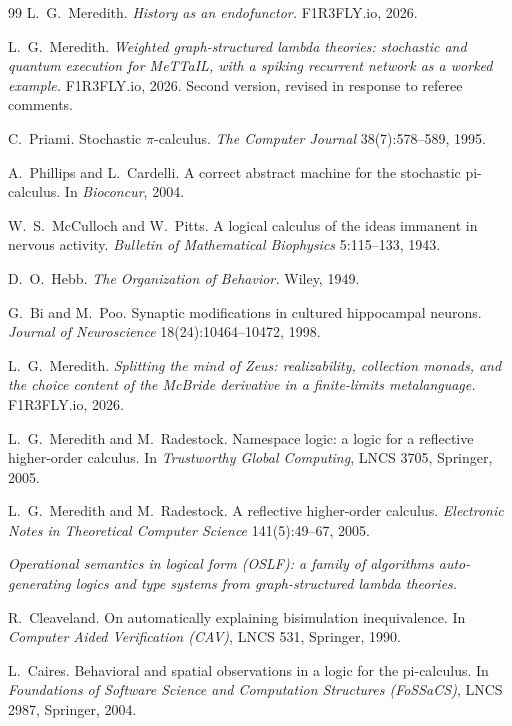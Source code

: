 \begin{thebibliography}{99}
L.\ G.\ Meredith. \emph{History as an endofunctor.} F1R3FLY.io, 2026.

L.\ G.\ Meredith. \emph{Weighted graph-structured lambda theories: stochastic and quantum execution for MeTTaIL, with a spiking recurrent network as a worked example.} F1R3FLY.io, 2026. Second version, revised in response to referee comments.

C.\ Priami. Stochastic $\pi$-calculus. \emph{The Computer Journal} 38(7):578--589, 1995.

A.\ Phillips and L.\ Cardelli. A correct abstract machine for the stochastic pi-calculus. In \emph{Bioconcur}, 2004.

W.\ S.\ McCulloch and W.\ Pitts. A logical calculus of the ideas immanent in nervous activity. \emph{Bulletin of Mathematical Biophysics} 5:115--133, 1943.

D.\ O.\ Hebb. \emph{The Organization of Behavior.} Wiley, 1949.

G.\ Bi and M.\ Poo. Synaptic modifications in cultured hippocampal neurons. \emph{Journal of Neuroscience} 18(24):10464--10472, 1998.

L.\ G.\ Meredith. \emph{Splitting the mind of Zeus: realizability, collection monads, and the choice content of the McBride derivative in a finite-limits metalanguage.} F1R3FLY.io, 2026.

L.\ G.\ Meredith and M.\ Radestock. Namespace logic: a logic for a reflective higher-order calculus. In \emph{Trustworthy Global Computing}, LNCS 3705, Springer, 2005.

L.\ G.\ Meredith and M.\ Radestock. A reflective higher-order calculus. \emph{Electronic Notes in Theoretical Computer Science} 141(5):49--67, 2005.

\emph{Operational semantics in logical form (OSLF): a family of algorithms auto-generating logics and type systems from graph-structured lambda theories.}

R.\ Cleaveland. On automatically explaining bisimulation inequivalence. In \emph{Computer Aided Verification (CAV)}, LNCS 531, Springer, 1990.

L.\ Caires. Behavioral and spatial observations in a logic for the pi-calculus. In \emph{Foundations of Software Science and Computation Structures (FoSSaCS)}, LNCS 2987, Springer, 2004.


\end{thebibliography}
